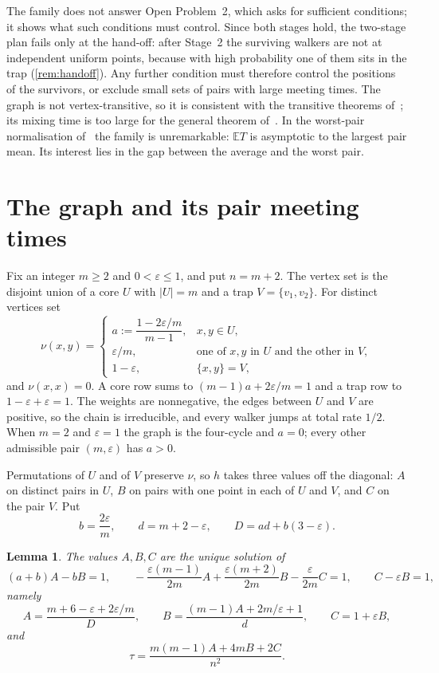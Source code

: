 \documentclass[11pt,a4paper]{article}
\numberwithin{equation}{section}
\newtheorem{lemma}[theorem]{Lemma}
\theoremstyle{remark}
\newcommand{\E}{\mathbb E}
\newcommand{\eps}{\varepsilon}
\begin{document}
The family does not answer Open Problem~2, which asks for sufficient conditions; it shows what such conditions must control. Since both stages hold, the two-stage plan fails only at the hand-off: after Stage~2 the surviving walkers are not at independent uniform points, because with high probability one of them sits in the trap (\cref{rem:handoff}). Any further condition must therefore control the positions of the survivors, or exclude small sets of pairs with large meeting times. The graph is not vertex-transitive, so it is consistent with the transitive theorems of~\cite{Oli13,Her}; its mixing time is too large for the general theorem of~\cite{Oli13}. In the worst-pair normalisation of~\cite{KMS19} the family is unremarkable: $\E T$ is asymptotic to the largest pair mean. Its interest lies in the gap between the average and the worst pair.

\section{The graph and its pair meeting times}\label{sec:graph}

Fix an integer $m\ge2$ and $0<\eps\le1$, and put $n=m+2$. The vertex set is the disjoint union of a core $U$ with $|U|=m$ and a trap $V=\{v_1,v_2\}$. For distinct vertices set
\begin{equation}\label{eq:weights}
\nu(x,y)=
\begin{cases}
a:=\dfrac{1-2\eps/m}{m-1}, & x,y\in U,\\[0.6em]
\eps/m, & \text{one of }x,y\text{ in }U\text{ and the other in }V,\\[0.3em]
1-\eps, & \{x,y\}=V,
\end{cases}
\end{equation}
and $\nu(x,x)=0$. A core row sums to $(m-1)a+2\eps/m=1$ and a trap row to $1-\eps+\eps=1$. The weights are nonnegative, the edges between $U$ and $V$ are positive, so the chain is irreducible, and every walker jumps at total rate $1/2$. When $m=2$ and $\eps=1$ the graph is the four-cycle and $a=0$; every other admissible pair $(m,\eps)$ has $a>0$.

Permutations of $U$ and of $V$ preserve $\nu$, so $h$ takes three values off the diagonal: $A$ on distinct pairs in $U$, $B$ on pairs with one point in each of $U$ and $V$, and $C$ on the pair $V$. Put
\[
b=\frac{2\eps}m,\qquad d=m+2-\eps,\qquad D=ad+b(3-\eps).
\]

\begin{lemma}\label{lem:pairs}
The values $A,B,C$ are the unique solution of
\begin{equation}\label{eq:pairsys}
(a+b)A-bB=1,\qquad -\frac{\eps(m-1)}{2m}A+\frac{\eps(m+2)}{2m}B-\frac{\eps}{2m}C=1,\qquad C-\eps B=1,
\end{equation}
namely
\begin{equation}\label{eq:pairsol}
A=\frac{m+6-\eps+2\eps/m}{D},\qquad B=\frac{(m-1)A+2m/\eps+1}{d},\qquad C=1+\eps B,
\end{equation}
and
\begin{equation}\label{eq:tau}
\tau=\frac{m(m-1)A+4mB+2C}{n^2}.
\end{equation}
\end{lemma}
\end{document}
